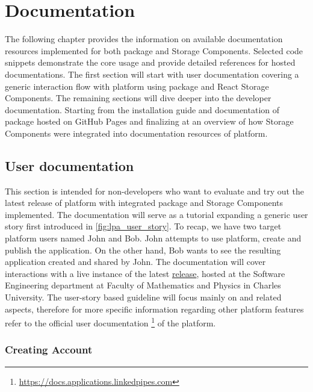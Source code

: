 \chapter{Documentation}
\label{chap:num_8}

The following chapter provides the information on available documentation resources implemented for both \lpas{} package and \lpa{} Storage Components. Selected code snippets demonstrate the core usage and provide detailed references for hosted documentations. The first section will start with user documentation covering a generic interaction flow with \lpa{} platform using \lpas{} package and React Storage Components. The remaining sections will dive deeper into the developer documentation. Starting from the installation guide and documentation of \lpa{} package hosted on GitHub Pages and finalizing at an overview of how \lpa{} Storage Components were integrated into documentation resources of \lpa{} platform.

\section{User documentation}
\label{sssec:user_documentation_guides}

This section is intended for non-developers who want to evaluate and try out the latest release of \lpa{} platform with integrated \lpas{} package and \lpa{} Storage Components implemented. The documentation will serve as a tutorial expanding a generic user story first introduced in \autoref{fig:lpa_user_story}. To recap, we have two target platform users named John and Bob. John attempts to use \lpa{} platform, create and publish the application. On the other hand, Bob wants to see the resulting application created and shared by John. The documentation will cover interactions with a live instance of the latest \href{https://applications.linkedpipes.com}{\lpa{} release}, hosted at the Software Engineering department at Faculty of Mathematics and Physics in Charles University.
The user-story based guideline will focus mainly on \lpas{} and \solid{} related aspects, therefore for more specific information regarding other \lpa{} platform features refer to the official user documentation \footnote{\url{https://docs.applications.linkedpipes.com}} of the platform. 

\subsection{Creating Account}

